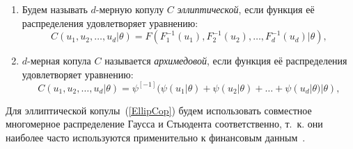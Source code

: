 \begin{enumerate}[label=(\arabic*),labelwidth=1cm,leftmargin=1cm]
\item 
Будем называть $d$-мерную копулу $C$ \textit{эллиптической}, если функция её распределения удовлетворяет уравнению:
\begin{equation} \label{EllipCop}
    C(u_1, u_2, \ldots,u_d|\theta) = F(F_1^{-1}(u_1),F_2^{-1}(u_2), \ldots,F_d^{-1}(u_d)|\theta),
\end{equation}
\item $d$-мерная копула $C$ называется \textit{архимедовой}, если функция её распределения удовлетворяет уравнению:
\begin{equation} \label{ArchCop}
    C(u_1,u_2,\ldots,u_d|\theta) = \psi^{[-1]}(\psi(u_1|\theta)+\psi(u_2|\theta) + \ldots + \psi(u_d|\theta) | \theta ),
\end{equation}
\end{enumerate}

Для эллиптической копулы~(\ref{EllipCop}) будем использовать совместное многомерное распределение Гаусса и Стьюдента соответственно, т.~к. они наиболее часто используются применительно к финансовым данным~\cite{Lourme2016}.

